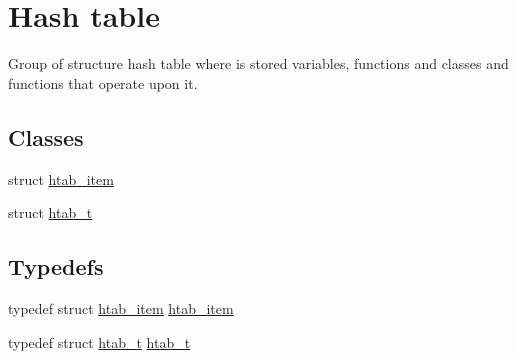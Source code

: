 \hypertarget{group__hash__table}{}\section{Hash table}
\label{group__hash__table}


Group of structure hash table where is stored variables, functions and classes and functions that operate upon it.  


\subsection*{Classes}
\begin{DoxyCompactItemize}
\item 
struct \hyperlink{structhtab__item}{htab\+\_\+item}
\item 
struct \hyperlink{structhtab__t}{htab\+\_\+t}
\end{DoxyCompactItemize}
\subsection*{Typedefs}
\begin{DoxyCompactItemize}
\item 
typedef struct \hyperlink{structhtab__item}{htab\+\_\+item} \hyperlink{group__hash__table_gaba90fca6bc80e8adc4fde58e3c98796d}{htab\+\_\+item}
\item 
typedef struct \hyperlink{structhtab__t}{htab\+\_\+t} \hyperlink{group__hash__table_ga9dd18346885fcbfba9565b383151a01d}{htab\+\_\+t}
\end{DoxyCompactItemize}
